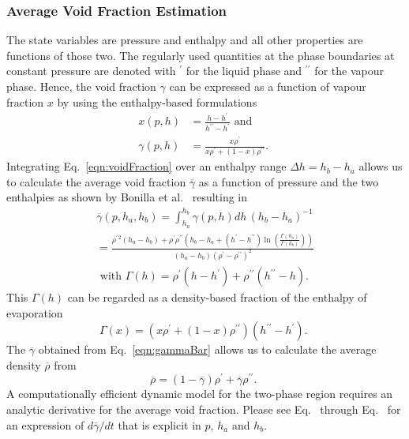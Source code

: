 \documentclass[11pt]{article} %
\begin{document}
\subsubsection{Average Void Fraction Estimation}\label{subsubsec:avgVoidFrac}
\newcommand{\rhop}{\ensuremath{\rho^\prime}}
\newcommand{\rhopp}{\ensuremath{\rho^{\prime\prime}}}
\newcommand{\hp}{\ensuremath{h^\prime}}
\newcommand{\hpp}{\ensuremath{h^{\prime\prime}}}
The state variables are pressure and enthalpy and all other properties are functions of those two. The regularly used quantities at the phase boundaries at constant pressure are denoted with $^\prime$ for the liquid phase and $^{\prime\prime}$ for the vapour phase. Hence, the void fraction $\gamma$ can be expressed as a function of vapour fraction $x$ by using the enthalpy-based formulations
\begin{align}
x(p,h)      &= \frac{h-\hp}{\hpp-\hp} \text{ and } \label{eqn:vapourFraction} \\
\gamma(p,h) &= \frac{x \rhop}{ x \rhop + \left( 1 - x \right) \rhopp }\text{. } \label{eqn:voidFraction}
\end{align}
Integrating Eq.~\ref{eqn:voidFraction} over an enthalpy range $\Delta h = h_b - h_a$ allows us to calculate the average void fraction $\overline{\gamma}$ as a function of pressure and the two enthalpies as shown by Bonilla et al.~\cite{Bonilla2015} resulting in 
\begin{gather}
\overline{\gamma}(p,h_a,h_b) = \int_{h_a}^{h_b}\!\!\!\!\!\!\!\!  \gamma(p,h)dh \, \left(h_b - h_a \right)^{-1} \\
= \frac{\rhop{}^2 \left(h_a-h_b\right) + \rhop\rhopp \left(h_b-h_a+\left(\hp-\hpp\right) \ln \left(\frac{\Gamma\left(h_a\right)}{\Gamma\left(h_b\right)}\right)\right)}
{\left(h_a-h_b\right) \left( \rhop-\rhopp \right)^2 } \label{eqn:gammaBar} \\
\text{ with } \Gamma(h) = \rhop (h-\hp) + \rhopp (\hpp-h) \text{. } \label{eqn:Gamma} 
\end{gather}
This $\Gamma(h)$ can be regarded as a density-based fraction of the enthalpy of evaporation 
\begin{equation}
\Gamma(x) = \left( x \rhop + (1-x) \rhopp \right) \left( \hpp-\hp \right) \text{. }
\end{equation}
The $\overline{\gamma}$ obtained from Eq.~\ref{eqn:gammaBar} allows us to calculate the average density $\overline{\rho}$ from 
\begin{equation}
\overline{\rho} = (1-\overline{\gamma}) \rhop + \overline{\gamma} \rhopp \text{. }
\end{equation}
A computationally efficient dynamic model for the two-phase region requires an analytic derivative for the average void fraction. Please see Eq.~\label{eqn:dgammabardt} through Eq.~\label{eqn:dgammabardhb} for an expression of $d\overline{\gamma}/dt$ that is explicit in $p$, $h_a$ and $h_b$. 
\end{document}
